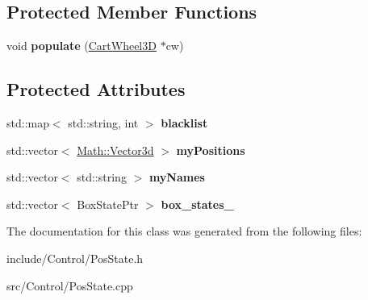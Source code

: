 \subsection*{Protected Member Functions}
\begin{DoxyCompactItemize}
\item 
\hypertarget{classCartWheel_1_1PosState_a2492eb6b9ab7151a7a498b4ba70152c6}{
void {\bfseries populate} (\hyperlink{classCartWheel_1_1CartWheel3D}{CartWheel3D} $\ast$cw)}
\label{classCartWheel_1_1PosState_a2492eb6b9ab7151a7a498b4ba70152c6}

\end{DoxyCompactItemize}
\subsection*{Protected Attributes}
\begin{DoxyCompactItemize}
\item 
\hypertarget{classCartWheel_1_1PosState_a9a594c52f9a3d8153c34c62f39551cd2}{
std::map$<$ std::string, int $>$ {\bfseries blacklist}}
\label{classCartWheel_1_1PosState_a9a594c52f9a3d8153c34c62f39551cd2}

\item 
\hypertarget{classCartWheel_1_1PosState_a7cbcc4d08b9f2d6a07404f5ba4210197}{
std::vector$<$ \hyperlink{classCartWheel_1_1Math_1_1Vector3d}{Math::Vector3d} $>$ {\bfseries myPositions}}
\label{classCartWheel_1_1PosState_a7cbcc4d08b9f2d6a07404f5ba4210197}

\item 
\hypertarget{classCartWheel_1_1PosState_ae34fea2a80d6ebc94414d8877cda7947}{
std::vector$<$ std::string $>$ {\bfseries myNames}}
\label{classCartWheel_1_1PosState_ae34fea2a80d6ebc94414d8877cda7947}

\item 
\hypertarget{classCartWheel_1_1PosState_a5ecde6d6a4bdf83ba855eb3e4deabfd9}{
std::vector$<$ BoxStatePtr $>$ {\bfseries box\_\-states\_\-}}
\label{classCartWheel_1_1PosState_a5ecde6d6a4bdf83ba855eb3e4deabfd9}

\end{DoxyCompactItemize}


The documentation for this class was generated from the following files:\begin{DoxyCompactItemize}
\item 
include/Control/PosState.h\item 
src/Control/PosState.cpp\end{DoxyCompactItemize}
